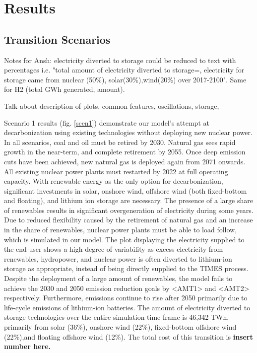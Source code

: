 \section{Results} \label{Results-and-discussion}
\subsection{Transition Scenarios}
Notes for Ansh: electricity diverted to storage could be reduced to text with percentages i.e. "total amount of electricity diverted to storage=, electricity for storage came from nuclear (50\%), solar(30\%),wind(20\%) over 2017-2100". Same for H2 (total GWh generated, amount).

Talk about description of plots, common features, oscillations, storage,

Scenario 1 results (fig. \ref{scen1}) demonstrate our model's attempt at decarbonization using existing technologies without deploying new nuclear power. In all scenarios, coal and oil must be retired by 2030. Natural gas sees rapid growth in the near-term, and complete retirement by 2055. Once deep emission cuts have been achieved, new natural gas is deployed again from 2071 onwards. All existing nuclear power plants must restarted by 2022 at full operating capacity. With renewable energy as the only option for decarbonization, significant investments in solar, onshore wind, offshore wind (both fixed-bottom and floating), and lithium ion storage are necessary. The presence of a large share of renewables results in significant overgeneration of electricity during some years. Due to reduced flexibility caused by the retirement of natural gas and an increase in the share of renewables, nuclear power plants must be able to load follow, which is simulated in our model. The plot displaying the electricity supplied to the end-user shows a high degree of variability as excess electricity from renewables, hydropower, and nuclear power is often diverted to lithium-ion storage as appropriate, instead of being directly supplied to the \gls{TIMES} process. Despite the deployment of a large amount of renewables, the model fails to achieve the 2030 and 2050 emission reduction goals by <AMT1> and <AMT2> respectively. Furthermore, emissions continue to rise after 2050 primarily due to life-cycle emissions of lithium-ion batteries. The amount of electricity diverted to storage technologies over the entire simulation time frame is 46,342 TWh, primarily from solar (36\%), onshore wind (22\%), fixed-bottom offshore wind (22\%),and floating offshore wind (12\%). The total cost of this transition is \textbf{insert number here.}


